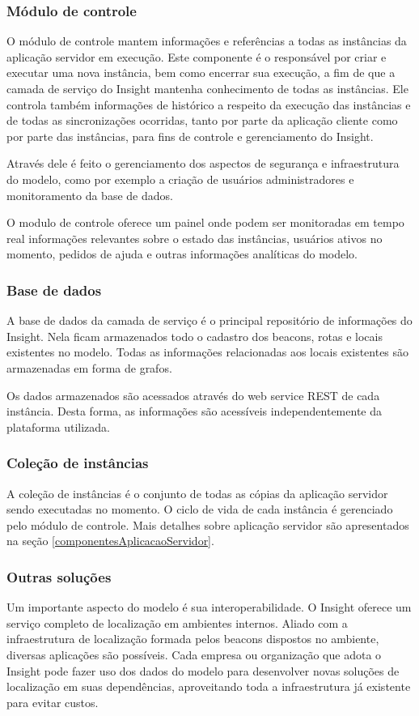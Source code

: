 \documentclass[english,brazilian]{UNISINOSmonografia}
\begin{document}
	\subsubsection{Módulo de controle}
O módulo de controle mantem informações e referências a todas as instâncias da aplicação servidor em execução. Este componente é o responsável por criar e executar uma nova instância, bem como encerrar sua execução, a fim de que a camada de serviço do Insight mantenha conhecimento de todas as instâncias. Ele controla também informações de histórico a respeito da execução das instâncias e de todas as sincronizações ocorridas, tanto por parte da aplicação cliente como por parte das instâncias, para fins de controle e gerenciamento do Insight. 

Através dele é feito o gerenciamento dos aspectos de segurança e infraestrutura do modelo, como por exemplo a criação de usuários administradores e monitoramento da base de dados.

O modulo de controle oferece um painel onde podem ser monitoradas em tempo real informações relevantes sobre o estado das instâncias, usuários ativos no momento, pedidos de ajuda e outras informações analíticas do modelo. 

	\subsubsection{Base de dados}
A base de dados da camada de serviço é o principal repositório de informações do Insight. Nela ficam armazenados todo o cadastro dos beacons, rotas e locais existentes no modelo. Todas as informações relacionadas aos locais existentes são armazenadas em forma de grafos.

Os dados armazenados são acessados através do web service REST de cada instância. Desta forma, as informações são acessíveis independentemente da plataforma utilizada.

	\subsubsection{Coleção de instâncias}
A coleção de instâncias é o conjunto de todas as cópias da aplicação servidor sendo executadas no momento. 
O ciclo de vida de cada instância é gerenciado pelo módulo de controle.
Mais detalhes sobre aplicação servidor são apresentados na seção \ref{componentesAplicacaoServidor}.

	\subsubsection{Outras soluções}
Um importante aspecto do modelo é sua interoperabilidade. O Insight oferece um serviço completo de localização em ambientes internos. Aliado com a infraestrutura de localização formada pelos beacons dispostos no ambiente, diversas aplicações são possíveis. Cada empresa ou organização que adota o Insight pode fazer uso dos dados do modelo para desenvolver novas soluções de localização em suas dependências, aproveitando toda a infraestrutura já existente para evitar custos. 
\end{document}
